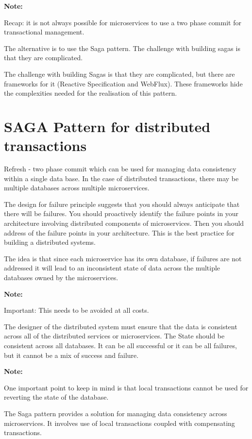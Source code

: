\documentclass[a4paper, 11pt]{book}
\newenvironment{note}{
    \begin{siderule}
        \textbf{Note: }
        }{
    \end{siderule}
}
\begin{document}
    \begin{note}
     Recap: it is not always possible for microservices to use a two phase commit for transactional management.
    \end{note}
    The alternative is to use the Saga pattern.
    The challenge with building sagas is that they are complicated.

    The challenge with building Sagas is that they are complicated, but there are frameworks for it (Reactive Specification and WebFlux).
    These frameworks hide the complexities needed for the realisation of this pattern.


    \section{SAGA Pattern for distributed transactions}
    Refresh - two phase commit which can be used for managing data consistency within a single data base.
    In the case of distributed transactions, there may be multiple databases across multiple microservices.

    The design for failure principle suggests that you should always anticipate that there will be failures.
    You should proactively identify the failure points in your architecture involving distributed components of microservices.
    Then you should address of the failure points in your architecture.
    This is the best practice for building a distributed systems.

    The idea is that since each microservice has its own database, if failures are not addressed it will lead to an inconsistent state of data across the multiple databases owned by the microservices.
    \begin{note}
    Important: This needs to be avoided at all costs.
    \end{note}

    The designer of the distributed system must ensure that the data is consistent across all of the distributed services or microservices.
    The State should be consistent across all databases.
    It can be all successful or it can be all failures, but it cannot be a mix of success and failure.
    \begin{note}
    One important point to keep in mind is that local transactions cannot be used for reverting the state of the database.
    \end{note}

    The Saga pattern provides a solution for managing data consistency across microservices.
    It involves use of local transactions coupled with compensating transactions.
\end{document}
